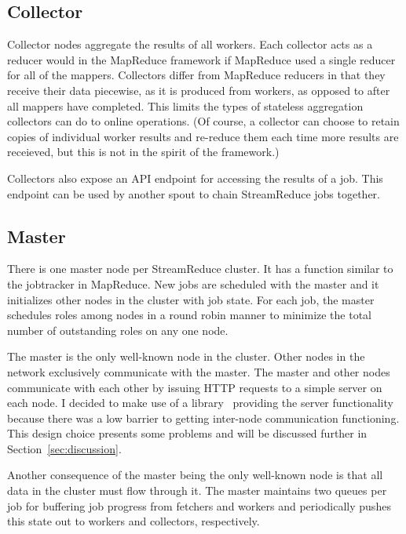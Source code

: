 \documentclass[12pt,twocolumn]{article}
\begin{document}
\subsection{Collector}
Collector nodes aggregate the results of all workers. Each collector acts as a reducer would
in the MapReduce framework if MapReduce used a single reducer for all of the mappers.
Collectors differ from MapReduce reducers in that they receive their data piecewise, as it
is produced from workers, as opposed to after all mappers have completed. This limits the
types of stateless aggregation collectors can do to online operations. (Of course, a collector
can choose to retain copies of individual worker results and re-reduce them each time more
results are receieved, but this is not in the spirit of the framework.)

Collectors also expose an API endpoint for accessing the results of a job. This endpoint
can be used by another spout to chain StreamReduce jobs together.
\subsection{Master}
\label{sec:master}
There is one master node per StreamReduce cluster. It has a function similar to the jobtracker in
MapReduce. New jobs are scheduled with the master and it initializes other nodes in the
cluster with job state. For each job, the master schedules roles among nodes in a round robin
manner to minimize the total number of outstanding roles on any one node.

The master is the only well-known node in the cluster. Other nodes in the network exclusively
communicate with the master. The master and other nodes communicate with each other by issuing
HTTP requests to a simple server on each node. I decided to make use of a library~\cite{sinatrarb}
providing the server functionality because there was a low barrier to getting inter-node
communication functioning. This design choice presents some problems and will be discussed
further in Section~\ref{sec:discussion}.

Another consequence of the master being the only well-known node is that all data in the
cluster must flow through it. The master maintains two queues per job for buffering job
progress from fetchers and workers and periodically pushes this state out to workers and
collectors, respectively.
\end{document}
